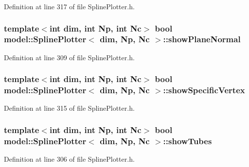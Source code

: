 Definition at line 317 of file Spline\+Plotter.\+h.

\hypertarget{classmodel_1_1_spline_plotter_a2601b9ddd2092997aef3eda955f9ccc5}{}
\subsubsection[{show\+Plane\+Normal}]{\setlength{\rightskip}{0pt plus 5cm}template$<$int dim, int Np, int Nc$>$ bool {\bf model\+::\+Spline\+Plotter}$<$ {\bf dim}, Np, {\bf Nc} $>$\+::show\+Plane\+Normal}\label{classmodel_1_1_spline_plotter_a2601b9ddd2092997aef3eda955f9ccc5}


Definition at line 309 of file Spline\+Plotter.\+h.

\hypertarget{classmodel_1_1_spline_plotter_a5c32c4bebd33e41d46fa36a2d0418476}{}
\subsubsection[{show\+Specific\+Vertex}]{\setlength{\rightskip}{0pt plus 5cm}template$<$int dim, int Np, int Nc$>$ bool {\bf model\+::\+Spline\+Plotter}$<$ {\bf dim}, Np, {\bf Nc} $>$\+::show\+Specific\+Vertex}\label{classmodel_1_1_spline_plotter_a5c32c4bebd33e41d46fa36a2d0418476}


Definition at line 315 of file Spline\+Plotter.\+h.

\hypertarget{classmodel_1_1_spline_plotter_aba9675d91bed88b0186cbf729a74451d}{}
\subsubsection[{show\+Tubes}]{\setlength{\rightskip}{0pt plus 5cm}template$<$int dim, int Np, int Nc$>$ bool {\bf model\+::\+Spline\+Plotter}$<$ {\bf dim}, Np, {\bf Nc} $>$\+::show\+Tubes}\label{classmodel_1_1_spline_plotter_aba9675d91bed88b0186cbf729a74451d}


Definition at line 306 of file Spline\+Plotter.\+h.

